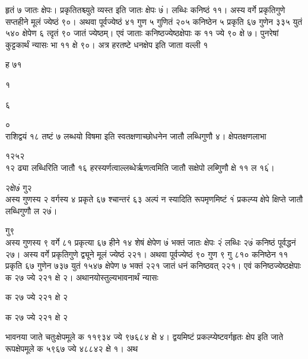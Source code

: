 \documentclass[11pt, openany]{book}
\begin{document}
\begin{sloppypar}
\hangindent=0.2in हृतं ७ जातः क्षेपः। प्रकृतितश्च्युते व्यस्त इति जातः क्षेपः ७ं। लब्धिः कनिष्ठं ११। अस्य वर्गे प्रकृतिगुणे सप्तहीने मूलं ज्येष्ठं ९०। अथवा पूर्वज्येष्ठं ४१ गुण ५ गुणितं २०५ कनिष्ठेन ५ प्रकृति ६७ गुणेन ३३५ युतं ५४० क्षेपेण ६ त्दृतं ९० जातं ज्येष्ठम्। एवं जाताः कनिष्ठज्येष्ठक्षेपाः क ११ ज्ये ९० क्षे ७। पुनरेषां कुट्टकार्थं न्यासः भा ११ क्षे ९०। अत्र हरतष्टे धनक्षेप इति जाता वल्ली १ 

\hspace{2.5in}ह ७\hspace{2.9in}१

\hspace{5.65in}१

\hspace{5.65in}६

\hspace{5.65in}०\\

\hangindent=0.2in राशिद्वयं १८ तष्टं ७ लब्धयो विषमा इति स्वतक्षणाच्छोधनेन जातौ लब्धिगुणौ ४। क्षेपतक्षणलाभा

\hspace{0.6in}१२\hspace{0.35in}५\hspace{3.45in}२\\

\hangindent=0.2in १२ ढ्या लब्धिरिति जातौ १६ हरस्यर्णत्वाल्लब्धेर्ऋणत्वमिति जातौ सक्षेपो लब्गुिणौ क्षे ११ ल १६ं।

\hspace{1.6in}२\hspace{3.2in}क्षे\hspace{0.15in}७ं गु\hspace{0.15in}२\\

\hangindent=0.2in अस्य गुणस्य २ वर्गस्य ४ प्रकृते ६७ श्चान्तरं ६३ अल्पं न स्यादिति रूपमृणमिष्टं १ं प्रकल्प्य क्षेपे क्षिप्ते जातौ लब्धिगुणौ ल २७ं।

\hspace{1.35in}गु\hspace{0.15in}९\\

\hangindent=0.2in अस्य गुणस्य ९ वर्गे ८१ प्रकृत्या ६७ हीने १४ शेषं क्षेपेण ७ं भक्तं जातः क्षेपः २ं लब्धिः २७ं कनिष्ठं पूर्वद्धनं २७। अस्य वर्गे प्रकृतिगुणे द्व्यूने मूलं ज्येष्ठं २२१। अथवा पूर्वज्येष्ठं ९० गुण ९ गु ८१० कनिष्ठेन ११ प्रकृति ६७ गुणेन ७३७ युतं १५४७ क्षेपेण ७ भक्तं २२१ जातं धनं कनिष्ठवत् २२१। एवं कनिष्ठज्येष्ठक्षेपाः क २७ ज्ये २२१ क्षे २। अथानयोस्तुल्यभावनार्थं न्यासः

\begin{center}
क २७ ज्ये २२१ क्षे २

क २७ ज्ये २२१ क्षे २
\end{center}

\hangindent=0.2in भावनया जाते चतुःक्षेपमूले क ११९३४ ज्ये ९७६८४ क्षे ४। द्वयमिष्टं प्रकल्प्येष्टवर्गहृतः क्षेप इति जाते रूपक्षेपमूले क ५९६७ ज्ये ४८८४२ क्षे १। अथ
\end{sloppypar}
\thispagestyle{empty}
\newpage
\end{document}
